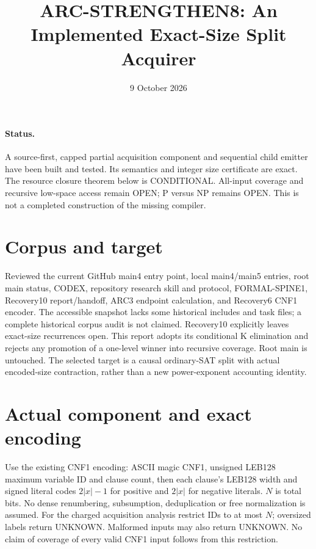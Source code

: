 \documentclass[11pt]{article}
\title{ARC-STRENGTHEN8: An Implemented Exact-Size Split Acquirer}
\date{9 October 2026}
\begin{document}
\maketitle
\paragraph{Status.} A source-first, capped partial acquisition component and
sequential child emitter have been built and tested. Its semantics and integer
size certificate are exact. The resource closure theorem below is CONDITIONAL.
All-input coverage and recursive low-space access remain OPEN; P versus NP
remains OPEN. This is not a completed construction of the missing compiler.

\section{Corpus and target}
Reviewed the current GitHub main4 entry point, local main4/main5 entries,
root main status, CODEX, repository research skill and protocol, FORMAL-SPINE1,
Recovery10 report/handoff, ARC3 endpoint calculation, and Recovery6 CNF1 encoder.
The accessible snapshot lacks some historical includes and task files; a complete
historical corpus audit is not claimed. Recovery10 explicitly leaves exact-size
recurrences open. This report adopts its conditional K elimination and rejects
any promotion of a one-level winner into recursive coverage. Root main is untouched.
The selected target is a causal ordinary-SAT split with actual encoded-size
contraction, rather than a new power-exponent accounting identity.

\section{Actual component and exact encoding}
Use the existing CNF1 encoding: ASCII magic CNF1, unsigned LEB128 maximum
variable ID and clause count, then each clause's LEB128 width and signed literal
codes $2|x|-1$ for positive and $2|x|$ for negative literals. $N$ is total bits.
No dense renumbering, subsumption, deduplication or free normalization is assumed.
For the charged acquisition analysis restrict IDs to at most $N$; oversized
labels return UNKNOWN. Malformed inputs may also return UNKNOWN. No claim of
coverage of every valid CNF1 input follows from this restriction.
\end{document}
